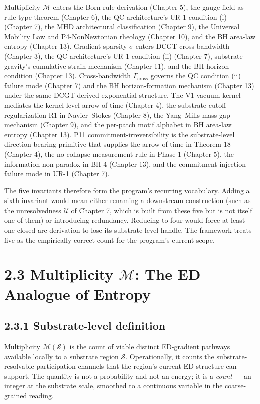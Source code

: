 \documentclass[11pt]{book}
\begin{document}
Multiplicity $\mathcal{M}$ enters the Born-rule derivation (Chapter 5), the gauge-field-as-rule-type theorem (Chapter 6), the QC architecture's UR-1 condition (i) (Chapter 7), the MHD architectural classification (Chapter 9), the Universal Mobility Law and P4-NonNewtonian rheology (Chapter 10), and the BH area-law entropy (Chapter 13). Gradient sparsity $\sigma$ enters DCGT cross-bandwidth (Chapter 3), the QC architecture's UR-1 condition (ii) (Chapter 7), substrate gravity's cumulative-strain mechanism (Chapter 11), and the BH horizon condition (Chapter 13). Cross-bandwidth $\Gamma_\mathrm{cross}$ governs the QC condition (ii) failure mode (Chapter 7) and the BH horizon-formation mechanism (Chapter 13) under the same DCGT-derived exponential structure. The V1 vacuum kernel mediates the kernel-level arrow of time (Chapter 4), the substrate-cutoff regularization R1 in Navier–Stokes (Chapter 8), the Yang–Mills mass-gap mechanism (Chapter 9), and the per-patch motif alphabet in BH area-law entropy (Chapter 13). P11 commitment-irreversibility is the substrate-level direction-bearing primitive that supplies the arrow of time in Theorem 18 (Chapter 4), the no-collapse measurement rule in Phase-1 (Chapter 5), the information-non-paradox in BH-4 (Chapter 13), and the commitment-injection failure mode in UR-1 (Chapter 7).

The five invariants therefore form the program's recurring vocabulary. Adding a sixth invariant would mean either renaming a downstream construction (such as the unresolvedness $\mathcal{U}$ of Chapter 7, which is built from these five but is not itself one of them) or introducing redundancy. Reducing to four would force at least one closed-arc derivation to lose its substrate-level handle. The framework treats five as the empirically correct count for the program's current scope.

\section{2.3 Multiplicity $\mathcal{M}$: The ED Analogue of Entropy}

\subsection{2.3.1 Substrate-level definition}

Multiplicity $\mathcal{M}(\mathcal{S})$ is the count of viable distinct ED-gradient pathways available locally to a substrate region $\mathcal{S}$. Operationally, it counts the substrate-resolvable participation channels that the region's current ED-structure can support. The quantity is not a probability and not an energy; it is a \textit{count} — an integer at the substrate scale, smoothed to a continuous variable in the coarse-grained reading.
\end{document}
